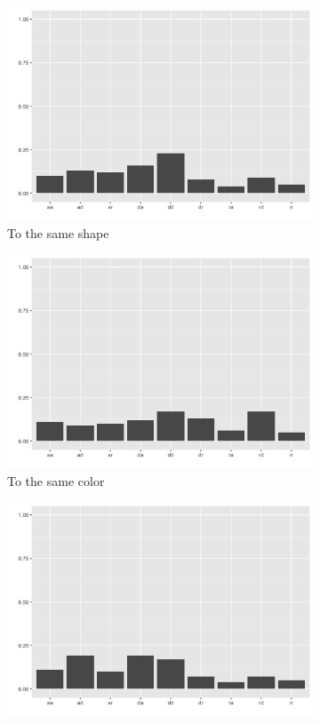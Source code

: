 \documentclass{article}
\begin{document}
\begin{figure}[h!]
  \centering
  \begin{subfigure}[t]{0.25\textwidth}
    \centering
    \includegraphics[width=\linewidth]{sim_agg_g1} 
    \caption{To the same shape} \label{fig:sim_agg_g1}
  \end{subfigure}
  \begin{subfigure}[t]{0.25\textwidth}
    \centering
    \includegraphics[width=\linewidth]{sim_agg_g3} 
    \caption{To the same color} \label{fig:sim_agg_g3}
  \end{subfigure}
  \begin{subfigure}[t]{0.25\textwidth}
    \centering
    \includegraphics[width=\linewidth]{sim_agg_g6} 

\end{subfigure}
\end{figure}
\end{document}
